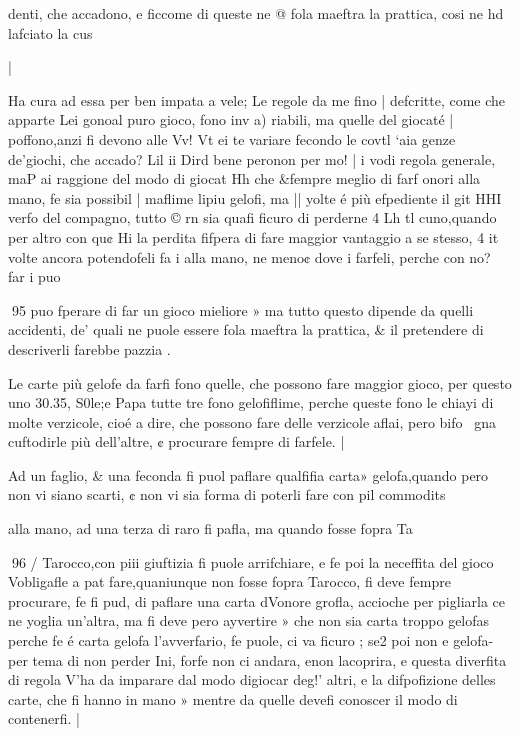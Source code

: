 \documentclass[11pt,a6paper]{article}
\begin{document}
 

denti, che accadono, e ficcome
di queste ne @ fola maeftra la
prattica, cosi ne hd lafciato la
cus

 
 

|

Ha cura ad essa per ben impata
a vele; Le regole da me fino
| defcritte, come che apparte
Lei gonoal puro gioco, fono inv
a) riabili, ma quelle del giocaté
| poffono,anzi fi devono alle Vv!
Vt ei te variare fecondo le covtl
‘aia genze de’giochi, che accado?
Lil ii Dird bene peronon per mo!
| i vodi regola generale, maP
ai raggione del modo di giocat
Hh che &fempre meglio di farf
onori alla mano, fe sia possibil
| maflime lipiu gelofi, ma
|| yolte é più efpediente il git
HHI verfo del compagno, tutto ©
rn  sia quafi ficuro di perderne 4
Lh tl cuno,quando per altro con qu¢
Hi la perdita fifpera di fare maggior
vantaggio a se stesso, 4
it volte ancora potendofeli fa
i alla mano, ne meno¢ dove
i farfeli, perche con no? far
i puo

 

 

 

 

 
95
puo fperare di far un gioco mieliore » ma tutto questo dipende da quelli accidenti, de’ quali
ne puole essere fola maeftra la
prattica, & il pretendere di descriverli farebbe pazzia .

Le carte più gelofe da farfi
fono quelle, che possono fare
maggior gioco, per questo uno
30.35, S0le;e Papa tutte tre fono gelofiflime, perche queste
fono le chiayi di molte verzicole, cioé a dire, che possono fare
delle verzicole aflai, pero bifo~
gna cuftodirle più dell’altre, ¢
procurare fempre di farfele. |

Ad un faglio, & una feconda
fi puol paflare qualfifia carta»
gelofa,quando pero non vi siano
scarti, ¢ non vi sia forma di poterli fare con pil commodits

alla mano, ad una terza di raro
fi pafla, ma quando fosse fopra
Ta
 

 
96 /
Tarocco,con piii giuftizia fi puole arrifchiare, e fe poi la neceffita del gioco Vobligafle a pat fare,quaniunque non fosse fopra
Tarocco, fi deve fempre procurare, fe fi pud, di paflare una
carta dVonore grofla, accioche
per pigliarla ce ne yoglia un’altra, ma fi deve pero ayvertire »
che non sia carta troppo gelofas
perche fe é carta gelofa l’avverfario, fe puole, ci va ficuro ; se2
poi non e gelofa-per tema di
non perder Ini, forfe non ci andara, enon lacoprira, e questa
diverfita di regola V’ha da imparare dal modo digiocar deg!’
altri, e la difpofizione delles
carte, che fi hanno in mano »
mentre da quelle devefi conoscer il modo di contenerfi. |
\end{document}
